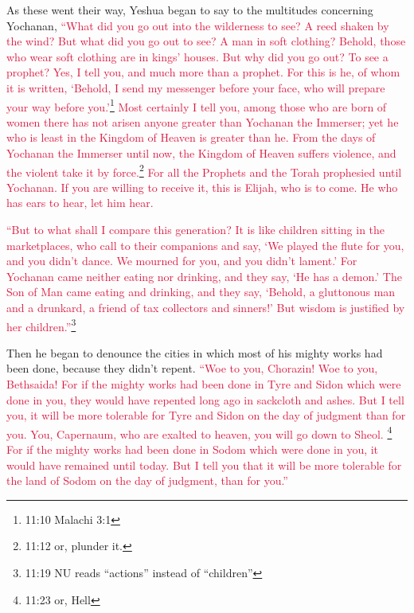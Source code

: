 \myverse{}As these went their way, Yeshua began to say to the multitudes
concerning Yochanan,
\textcolor{crimson}{“What did you go out into the wilderness to see? A reed shaken by the wind?
}
\myverse{}\textcolor{crimson}{But what did you go out to see? A man in soft clothing? Behold, those who
	wear soft clothing are in kings’ houses.
}
\myverse{}\textcolor{crimson}{But why did you go out? To see a prophet? Yes, I tell you, and much more
	than a prophet.
}
\myverse{}\textcolor{crimson}{For this is he, of whom it is written, ‘Behold, I send my messenger before
	your face, who will prepare your way before you.’}\footnote{11:10 Malachi 3:1
}
\myverse{}\textcolor{crimson}{Most certainly I tell you, among those who are born of women there has
	not arisen anyone greater than Yochanan the Immerser; yet he who is least in the Kingdom of Heaven is
	greater than he.
}
\myverse{}\textcolor{crimson}{From the days of Yochanan the Immerser until now, the Kingdom of Heaven
	suffers violence, and the violent take it by force.}\footnote{11:12 or, plunder it.
}
\myverse{}\textcolor{crimson}{For all the Prophets and the Torah prophesied until Yochanan.
}
\myverse{}\textcolor{crimson}{If you are willing to receive it, this is Elijah, who is to come.
}
\myverse{}\textcolor{crimson}{He who has ears to hear, let him hear.}

\myverse{}\textcolor{crimson}{“But to what shall I compare this generation? It is like
	children sitting in the marketplaces, who call to their companions
}
\myverse{}\textcolor{crimson}{and say, ‘We played the flute for you, and you didn’t dance. We mourned
	for you, and you didn’t lament.’
}
\myverse{}\textcolor{crimson}{For Yochanan came neither eating nor drinking, and they say, ‘He has
	a demon.’
}
\myverse{}\textcolor{crimson}{The Son of Man came eating and drinking, and they say, ‘Behold, a gluttonous
	man and a drunkard, a friend of tax collectors and sinners!’ But wisdom is justified by her children.”}\footnote{11:19 NU reads “actions” instead of “children”}

\myverse{}Then he began to denounce the cities in which most of his mighty
works had been done, because they didn’t repent.
\myverse{}\textcolor{crimson}{“Woe to you, Chorazin! Woe to you, Bethsaida! For if the mighty works
	had been done in Tyre and Sidon which were done in you, they would have repented long ago in sackcloth
	and ashes.
}
\myverse{}\textcolor{crimson}{But I tell you, it will be more tolerable for Tyre and Sidon on the day
	of judgment than for you.
}
\myverse{}\textcolor{crimson}{You, Capernaum, who are exalted to heaven, you will go down to Sheol.
}\footnote{11:23 or, Hell}
\textcolor{crimson}{For if the mighty works had been done in Sodom which were done in you, it would have remained until
	today.
}
\myverse{}\textcolor{crimson}{But I tell you that it will be more tolerable for the land of Sodom on
	the day of judgment, than for you.”}

